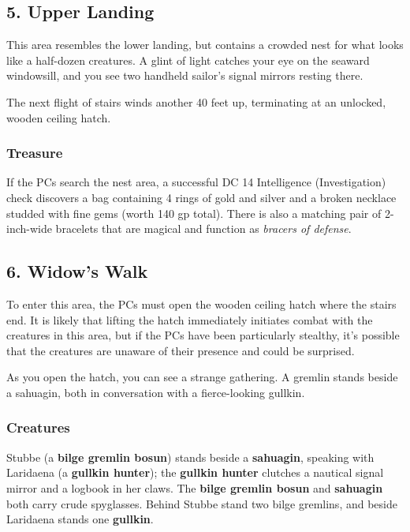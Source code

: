 \documentclass[10pt,a4paper,twoside,bg=print,twocolumn,openany,nodeprecatedcode]{dndbook}
\begin{document}
\subsection{5. Upper Landing}
\begin{DndReadAloud}{}
This area resembles the lower landing, but contains a crowded nest for what looks like a half-dozen creatures. A glint of light catches your eye on the seaward windowsill, and you see two handheld sailor's signal mirrors resting there.

\end{DndReadAloud}

The next flight of stairs winds another 40 feet up, terminating at an unlocked, wooden ceiling hatch.

\subsubsection{Treasure}
If the PCs search the nest area, a successful DC 14 Intelligence (Investigation) check discovers a bag containing 4 rings of gold and silver and a broken necklace studded with fine gems (worth 140 gp total). There is also a matching pair of 2-inch-wide bracelets that are magical and function as \textit{bracers of defense}.

\subsection{6. Widow's Walk}
To enter this area, the PCs must open the wooden ceiling hatch where the stairs end. It is likely that lifting the hatch immediately initiates combat with the creatures in this area, but if the PCs have been particularly stealthy, it's possible that the creatures are unaware of their presence and could be surprised.

\begin{DndReadAloud}{}
As you open the hatch, you can see a strange gathering. A gremlin stands beside a sahuagin, both in conversation with a fierce-looking gullkin.

\end{DndReadAloud}

\subsubsection{Creatures}
Stubbe (a \textbf{bilge gremlin bosun}) stands beside a \textbf{sahuagin}, speaking with Laridaena (a \textbf{gullkin hunter}); the \textbf{gullkin hunter} clutches a nautical signal mirror and a logbook in her claws. The \textbf{bilge gremlin bosun} and \textbf{sahuagin} both carry crude spyglasses. Behind Stubbe stand two bilge gremlins, and beside Laridaena stands one \textbf{gullkin}.
\end{document}
